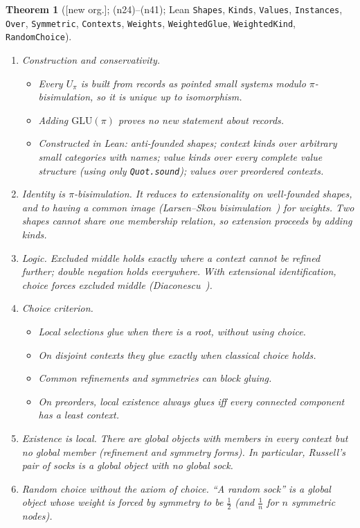\documentclass[11pt]{article}
\newtheorem{theorem}{Theorem}[section]
\theoremstyle{definition}
\theoremstyle{remark}
\newcommand{\GLU}{\mathrm{GLU}}
\newcommand{\lean}[1]{\texttt{#1}}
\newcommand{\status}[1]{\textsf{[#1]}}
\newcommand{\note}[1]{\textsf{(n#1)}}
\begin{document}
\begin{theorem}[\status{new org.}; \note{24}--\note{41}; Lean \lean{Shapes}, \lean{Kinds}, \lean{Values}, \lean{Instances}, \lean{Over}, \lean{Symmetric}, \lean{Contexts}, \lean{Weights}, \lean{WeightedGlue}, \lean{WeightedKind}, \lean{RandomChoice}]
\leavevmode
\begin{enumerate}
\item \emph{Construction and conservativity.}
  \begin{itemize}
  \item Every $U_\pi$ is built from records as pointed small systems modulo $\pi$-bisimulation, so it is unique up to isomorphism.
  \item Adding $\GLU(\pi)$ proves no new statement about records.
  \item Constructed in Lean: anti-founded shapes; context kinds over arbitrary small categories with names; value kinds over every complete value structure (using only \texttt{Quot.sound}); values over preordered contexts.
  \end{itemize}
\item \emph{Identity} is $\pi$-bisimulation. It reduces to extensionality on well-founded shapes, and to having a common image (Larsen--Skou bisimulation~\cite{LarsenSkou91}) for weights. Two shapes cannot share one membership relation, so extension proceeds by adding kinds.
\item \emph{Logic.} Excluded middle holds exactly where a context cannot be refined further; double negation holds everywhere. With extensional identification, choice forces excluded middle (Diaconescu~\cite{Diaconescu75}).
\item \emph{Choice criterion.}
  \begin{itemize}
  \item Local selections glue when there is a root, without using choice.
  \item On disjoint contexts they glue exactly when classical choice holds.
  \item Common refinements and symmetries can block gluing.
  \item On preorders, local existence always glues iff every connected component has a least context.
  \end{itemize}
\item \emph{Existence is local.} There are global objects with members in every context but no global member (refinement and symmetry forms). In particular, Russell's pair of socks is a global object with no global sock.
\item \emph{Random choice without the axiom of choice.} ``A random sock'' is a global object whose weight is forced by symmetry to be $\tfrac12$ (and $\tfrac1n$ for $n$ symmetric nodes).

\end{enumerate}
\end{theorem}
\end{document}
